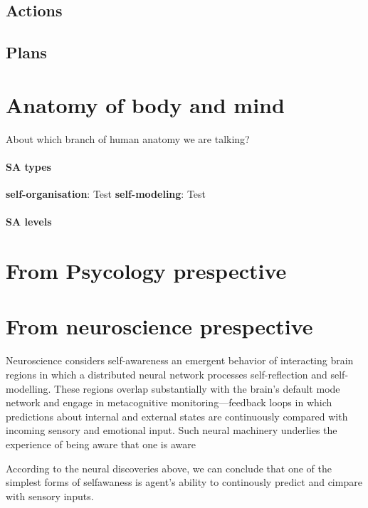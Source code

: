 \documentclass[a4paper]{article}
\begin{document}
    \subsection{Actions}
    
    \subsection{Plans}
    
    
    \section{Anatomy of body and mind}
    
    About which branch of human anatomy we are talking? 
    
    \paragraph{SA types}
        \textbf{self-organisation}: Test
        \textbf{self-modeling}: Test
    
    \paragraph{SA levels}
    
    
    \section{From Psycology prespective}
    
    
    \section{From neuroscience prespective}
    Neuroscience considers self-awareness an emergent behavior of interacting brain regions in which a distributed neural network processes self-reflection and self-modelling. These regions overlap substantially with the brain's default mode network and engage in metacognitive monitoring—feedback loops in which predictions about internal and external states are continuously compared with incoming sensory and emotional input. Such neural machinery underlies the experience of being aware that one is aware \cite{fleming-frith-2014-metacognition}
    
    According to the neural discoveries above, we can conclude that one of the simplest forms of selfawaness is agent's ability to continously predict and cimpare with sensory inputs.
    
\end{document}
